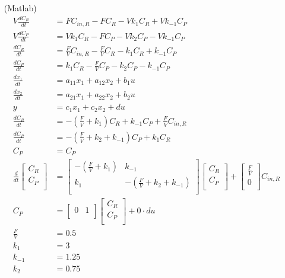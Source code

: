 \documentclass[12pt]{article}
\begin{document}
\begin{enumerate}
\begin{enumerate}
    \item[(Matlab)]
    \begin{align*}
        V \frac{dC_R}{dt} &= F C_{in,R} - F C_R - V k_1 C_R + V k_{-1} C_P \\
        V \frac{dC_P}{dt} &= V k_1 C_R - F C_P - V k_2 C_P - V k_{-1} C_P \\
        \frac{dC_R}{dt} &= \frac{F}{V} C_{in,R} - \frac{F}{V} C_R - k_1 C_R + k_{-1} C_P \\
        \frac{dC_P}{dt} &= k_1 C_R - \frac{F}{V} C_P - k_2 C_P - k_{-1} C_P \\
        \frac{dx_1}{dt} &= a_{11} x_1 + a_{12} x_2 + b_1 u \\
        \frac{dx_2}{dt} &= a_{21} x_1 + a_{22} x_2 + b_2 u \\
        y &= c_1 x_1 + c_2 x_2 + du \\
        \frac{dC_R}{dt} &= - \left(\frac{F}{V} + k_1\right) C_R + k_{-1} C_P + \frac{F}{V} C_{in,R} \\
        \frac{dC_P}{dt} &= -\left(\frac{F}{V} + k_2 + k_{-1}\right) C_P + k_1 C_R \\
        C_P &= C_P \\
        \frac{d}{dt}\begin{bmatrix}
        C_R \\
        C_P \\
        \end{bmatrix} &= \begin{bmatrix}
        - \left(\frac{F}{V} + k_1\right) & k_{-1} \\
        k_1 & -\left(\frac{F}{V} + k_2 + k_{-1}\right) \\
        \end{bmatrix} \begin{bmatrix}
        C_R \\
        C_P \\
        \end{bmatrix} + \begin{bmatrix}
        \frac{F}{V} \\
        0 \\
        \end{bmatrix} C_{in,R} \\
        C_P &= \begin{bmatrix}
        0 & 1 \\
        \end{bmatrix} \begin{bmatrix}
        C_R \\
        C_P \\
        \end{bmatrix} + 0 \cdot du \\
        \frac{F}{V} &= 0.5 \\
        k_1 &= 3 \\
        k_{-1} &= 1.25 \\
        k_2 &= 0.75
    \end{align*}


\end{enumerate}
\end{enumerate}
\end{document}

